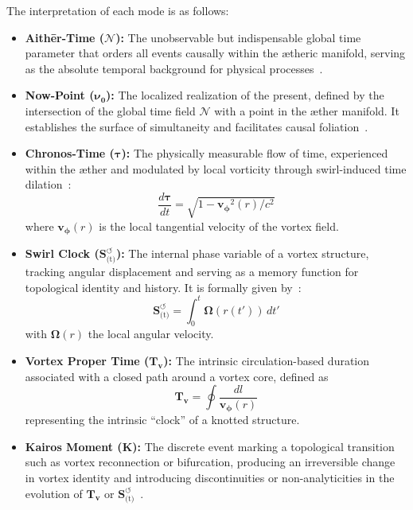 \documentclass[preprint,notitlepage]{revtex4-2}
\begin{document}
\noindent The interpretation of each mode is as follows:
\begin{itemize}
    \item \textbf{Aithēr-Time ($\boldsymbol{\mathcal{N}}$):} The unobservable but indispensable global time parameter that orders all events causally within the ætheric manifold, serving as the absolute temporal background for physical processes~\cite{VAM-8, VAM-13}.

    \item \textbf{Now-Point ($\boldsymbol{\nu_0}$):} The localized realization of the present, defined by the intersection of the global time field $\boldsymbol{\mathcal{N}}$ with a point in the æther manifold. It establishes the surface of simultaneity and facilitates causal foliation~\cite{VAM-8, VAM-13}.

    \item \textbf{Chronos-Time ($\boldsymbol{\tau}$):} The physically measurable flow of time, experienced within the æther and modulated by local vorticity through swirl-induced time dilation~\cite{VAM-1, VAM-8}:
    \[
        \frac{d\boldsymbol{\tau}}{dt} = \sqrt{1 - \boldsymbol{v_\phi}^2(r)/c^2}
    \]
    where $\boldsymbol{v_\phi}(r)$ is the local tangential velocity of the vortex field.

    \item \textbf{Swirl Clock ($\boldsymbol{S}^{\boldsymbol{\circlearrowleft}}_\text{(t)}$):} The internal phase variable of a vortex structure, tracking angular displacement and serving as a memory function for topological identity and history. It is formally given by~\cite{VAM-2, VAM-13}:
    \[
        \boldsymbol{S}^{\boldsymbol{\circlearrowleft}}_\text{(t)} = \int_{0}^{t} \boldsymbol{\Omega}(r(t'))\, dt'
    \]
    with $\boldsymbol{\Omega}(r)$ the local angular velocity.

    \item \textbf{Vortex Proper Time ($\boldsymbol{T_v}$):} The intrinsic circulation-based duration associated with a closed path around a vortex core, defined as~\cite{VAM-2, VAM-13}
    \[
        \boldsymbol{T_v} = \oint \frac{dl}{\boldsymbol{v_\phi}(r)}
    \]
    representing the intrinsic “clock” of a knotted structure.

    \item \textbf{Kairos Moment ($\mathbb{\boldsymbol{K}}$):}
    The discrete event marking a topological transition such as vortex reconnection or bifurcation, producing an irreversible change in vortex identity and introducing discontinuities or non-analyticities in the evolution of $\boldsymbol{T_v}$ or $\boldsymbol{S}^{\boldsymbol{\circlearrowleft}}_\text{(t)}$~\cite{VAM-13, VAM-15}.
\end{itemize}
\end{document}

